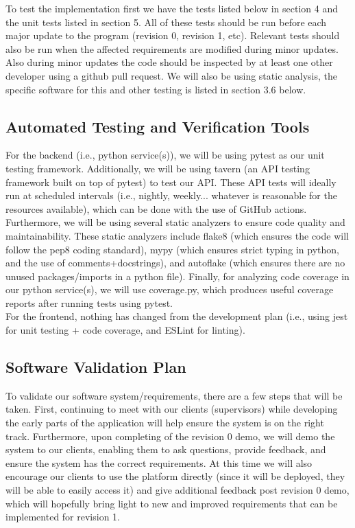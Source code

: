 \documentclass[12pt, titlepage]{article}
\begin{document}
To test the implementation first we have the tests listed below in section 4 and the unit tests listed in section 5. 
All of these tests should be run before each major update to the program (revision 0, revision 1, etc). Relevant tests should
also be run when the affected requirements are modified during minor updates. Also during minor updates the code should be 
inspected by at least one other developer using a github pull request. We will also be using static analysis, the specific 
software for this and other testing is listed in section 3.6 below.

\subsection{Automated Testing and Verification Tools}

For the backend (i.e., python service(s)), we will be using pytest as our unit testing framework. Additionally,
we will be using tavern (an API testing framework built on top of pytest) to test our API. These API tests will
ideally run at scheduled intervals (i.e., nightly, weekly... whatever is reasonable for the resources available), which can be 
done with the use of GitHub actions. Furthermore, we will be using several static analyzers to ensure code quality and maintainability. These 
static analyzers include flake8 (which ensures the code will follow the pep8 coding standard), mypy (which ensures strict typing in python,
and the use of comments+docstrings), and autoflake (which ensures there are no unused packages/imports in a python file). Finally, for analyzing 
code coverage in our python service(s), we will use coverage.py, which produces useful coverage reports after running tests using pytest.\\

For the frontend, nothing has changed from the development plan (i.e., using jest for unit testing + code coverage, and ESLint for linting).

\subsection{Software Validation Plan}

To validate our software system/requirements, there are a few steps that will be taken. First, continuing to meet with our clients (supervisors) while developing
the early parts of the application will help ensure the system is on the right track. Furthermore, upon completing of the revision 0 demo, we will
demo the system to our clients, enabling them to ask questions, provide feedback, and ensure the system has the correct requirements. At this
time we will also encourage our clients to use the platform directly (since it will be deployed, they will be able to easily access it) and give additional feedback post revision 0 demo,
which will hopefully bring light to new and improved requirements that can be implemented for revision 1. 
\end{document}

